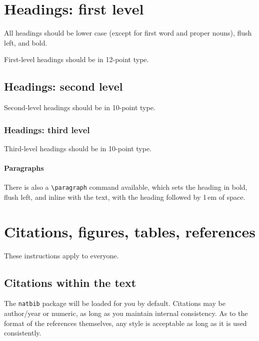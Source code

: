 \documentclass{article}
\begin{document}
\section{Headings: first level}
\label{headings}


All headings should be lower case (except for first word and proper nouns),
flush left, and bold.


First-level headings should be in 12-point type.


\subsection{Headings: second level}


Second-level headings should be in 10-point type.


\subsubsection{Headings: third level}


Third-level headings should be in 10-point type.


\paragraph{Paragraphs}


There is also a \verb+\paragraph+ command available, which sets the heading in
bold, flush left, and inline with the text, with the heading followed by 1\,em
of space.


\section{Citations, figures, tables, references}
\label{others}


These instructions apply to everyone.


\subsection{Citations within the text}


The \verb+natbib+ package will be loaded for you by default.  Citations may be
author/year or numeric, as long as you maintain internal consistency.  As to the
format of the references themselves, any style is acceptable as long as it is
used consistently.
\end{document}
